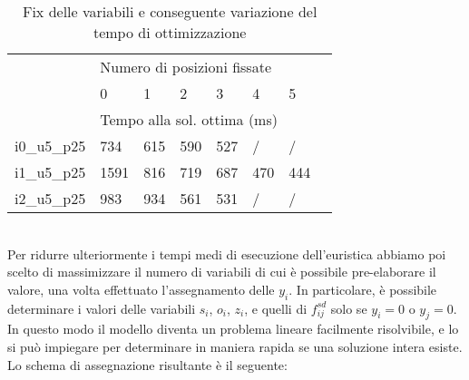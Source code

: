 \begin{table}[]
	\centering
	\begin{tabular}{@{}llllllll@{}}
		\cmidrule(r){1-7}
		& \multicolumn{6}{l}{Numero di posizioni fissate}                                                                                             &  \\ \cmidrule(r){1-7}
		& \multicolumn{1}{l|}{0}    & \multicolumn{1}{l|}{1}   & \multicolumn{1}{l|}{2}   & \multicolumn{1}{l|}{3}   & \multicolumn{1}{l|}{4}   & 5   &  \\
		& \multicolumn{6}{l}{Tempo alla sol. ottima (ms)}                                                                                             &  \\ \cmidrule(r){1-7}
		i0\_u5\_p25 & \multicolumn{1}{l|}{734}  & \multicolumn{1}{l|}{615} & \multicolumn{1}{l|}{590} & \multicolumn{1}{l|}{527} & \multicolumn{1}{l|}{/}   & /   &  \\ \cmidrule(r){1-7}
		i1\_u5\_p25 & \multicolumn{1}{l|}{1591} & \multicolumn{1}{l|}{816} & \multicolumn{1}{l|}{719} & \multicolumn{1}{l|}{687} & \multicolumn{1}{l|}{470} & 444 &  \\ \cmidrule(r){1-7}
		i2\_u5\_p25 & \multicolumn{1}{l|}{983}  & \multicolumn{1}{l|}{934} & \multicolumn{1}{l|}{561} & \multicolumn{1}{l|}{531} & \multicolumn{1}{l|}{/}   & /   &  \\ \cmidrule(r){1-7}
	\end{tabular}
	\caption{Fix delle variabili e conseguente variazione del tempo di ottimizzazione}
	\label{tab:fix}
\end{table}
%
\\Per ridurre ulteriormente i tempi medi di esecuzione dell'euristica abbiamo poi scelto di massimizzare il numero di variabili di cui è possibile pre-elaborare il valore, una volta effettuato l'assegnamento delle $y_i$. In particolare, è possibile determinare i valori delle variabili $s_i$, $o_i$, $z_i$, e quelli di $f_{ij}^{sd}$ solo se $y_i = 0$ o $y_j = 0$. In questo modo il modello diventa un problema lineare facilmente risolvibile, e lo si può impiegare per determinare in maniera rapida se una soluzione intera esiste.\\
Lo schema di assegnazione risultante è il seguente: 
